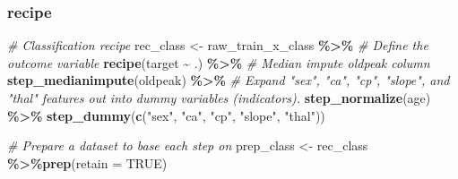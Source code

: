 \documentclass[
]{book}
\newenvironment{Shaded}{\begin{snugshade}}{\end{snugshade}}
\newcommand{\CommentTok}[1]{\textcolor[rgb]{0.56,0.35,0.01}{\textit{#1}}}
\newcommand{\DataTypeTok}[1]{\textcolor[rgb]{0.13,0.29,0.53}{#1}}
\newcommand{\KeywordTok}[1]{\textcolor[rgb]{0.13,0.29,0.53}{\textbf{#1}}}
\newcommand{\NormalTok}[1]{#1}
\newcommand{\OperatorTok}[1]{\textcolor[rgb]{0.81,0.36,0.00}{\textbf{#1}}}
\newcommand{\OtherTok}[1]{\textcolor[rgb]{0.56,0.35,0.01}{#1}}
\newcommand{\StringTok}[1]{\textcolor[rgb]{0.31,0.60,0.02}{#1}}
\begin{document}
\hypertarget{recipe-1}{%
\subsubsection{recipe}\label{recipe-1}}

\begin{Shaded}
\begin{Highlighting}[]
\CommentTok{\# Classification recipe }
\NormalTok{rec\_class \textless{}{-}}\StringTok{ }\NormalTok{raw\_train\_x\_class }\OperatorTok{\%\textgreater{}\%}\StringTok{ }
\StringTok{  }\CommentTok{\# Define the outcome variable }
\StringTok{  }\KeywordTok{recipe}\NormalTok{(target }\OperatorTok{\textasciitilde{}}\StringTok{ }\NormalTok{.) }\OperatorTok{\%\textgreater{}\%}
\StringTok{  }\CommentTok{\# Median impute oldpeak column }
\StringTok{  }\KeywordTok{step\_medianimpute}\NormalTok{(oldpeak) }\OperatorTok{\%\textgreater{}\%}
\StringTok{  }\CommentTok{\# Expand "sex", "ca", "cp", "slope", and "thal" features out into dummy variables (indicators).}
\StringTok{  }\KeywordTok{step\_normalize}\NormalTok{(age) }\OperatorTok{\%\textgreater{}\%}
\StringTok{  }\KeywordTok{step\_dummy}\NormalTok{(}\KeywordTok{c}\NormalTok{(}\StringTok{"sex"}\NormalTok{, }\StringTok{"ca"}\NormalTok{, }\StringTok{"cp"}\NormalTok{, }\StringTok{"slope"}\NormalTok{, }\StringTok{"thal"}\NormalTok{)) }

\CommentTok{\# Prepare a dataset to base each step on}
\NormalTok{prep\_class \textless{}{-}}\StringTok{ }\NormalTok{rec\_class }\OperatorTok{\%\textgreater{}\%}\KeywordTok{prep}\NormalTok{(}\DataTypeTok{retain =} \OtherTok{TRUE}\NormalTok{) }
\end{Highlighting}
\end{Shaded}

\begin{Shaded}
\end{Shaded}
\end{document}
